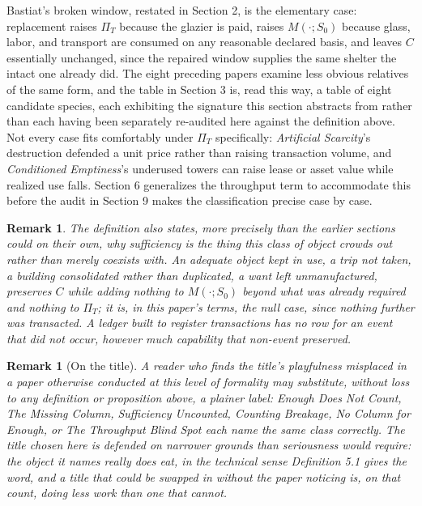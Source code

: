 \documentclass[11pt]{article}
\newtheorem{remark}[definition]{Remark}
\begin{document}
Bastiat's broken window, restated in Section 2, is the elementary case: replacement raises $\Pi_T$ because the glazier is paid, raises $M(\cdot; S_0)$ because glass, labor, and transport are consumed on any reasonable declared basis, and leaves $C$ essentially unchanged, since the repaired window supplies the same shelter the intact one already did. The eight preceding papers examine less obvious relatives of the same form, and the table in Section 3 is, read this way, a table of eight candidate species, each exhibiting the signature this section abstracts from rather than each having been separately re-audited here against the definition above. Not every case fits comfortably under $\Pi_T$ specifically: \emph{Artificial Scarcity}'s destruction defended a unit price rather than raising transaction volume, and \emph{Conditioned Emptiness}'s underused towers can raise lease or asset value while realized use falls. Section 6 generalizes the throughput term to accommodate this before the audit in Section 9 makes the classification precise case by case.

\begin{remark}
The definition also states, more precisely than the earlier sections could on their own, why sufficiency is the thing this class of object crowds out rather than merely coexists with. An adequate object kept in use, a trip not taken, a building consolidated rather than duplicated, a want left unmanufactured, preserves $C$ while adding nothing to $M(\cdot; S_0)$ beyond what was already required and nothing to $\Pi_T$; it is, in this paper's terms, the null case, since nothing further was transacted. A ledger built to register transactions has no row for an event that did not occur, however much capability that non-event preserved.
\end{remark}

\begin{remark}[On the title]
A reader who finds the title's playfulness misplaced in a paper otherwise conducted at this level of formality may substitute, without loss to any definition or proposition above, a plainer label: \emph{Enough Does Not Count}, \emph{The Missing Column}, \emph{Sufficiency Uncounted}, \emph{Counting Breakage}, \emph{No Column for Enough}, or \emph{The Throughput Blind Spot} each name the same class correctly. The title chosen here is defended on narrower grounds than seriousness would require: the object it names really does eat, in the technical sense Definition 5.1 gives the word, and a title that could be swapped in without the paper noticing is, on that count, doing less work than one that cannot.
\end{remark}
\end{document}
